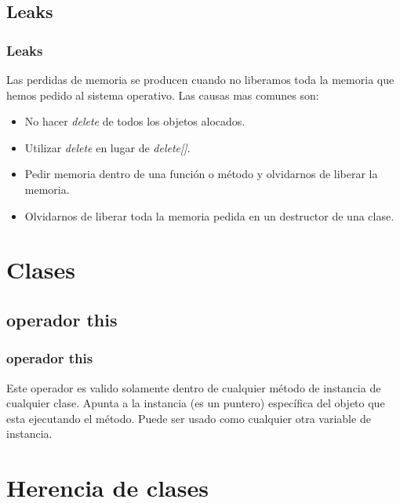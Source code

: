 \documentclass{beamer}
\begin{document}
\subsection{Leaks}
\begin{frame}
\frametitle{Leaks}

Las perdidas de memoria se producen cuando no liberamos toda la memoria que hemos pedido al sistema operativo. Las causas mas comunes son:
\begin{itemize}
 \item No hacer \emph{delete} de todos los objetos alocados.
 \item Utilizar \emph{delete} en lugar de \emph{delete[]}.
 \item Pedir memoria dentro de una función o método y olvidarnos de liberar la memoria.
 \item Olvidarnos de liberar toda la memoria pedida en un destructor de una clase.
\end{itemize}

\end{frame}

\section{Clases}

\subsection{operador this}
\begin{frame}
\frametitle{operador this}
  Este operador es valido solamente dentro de cualquier método de instancia de cualquier clase. 
  Apunta a la instancia (es un puntero) específica del objeto que esta ejecutando el método.
  Puede ser usado como cualquier otra variable de instancia.

\end{frame}

\section{Herencia de clases}
\end{document}
